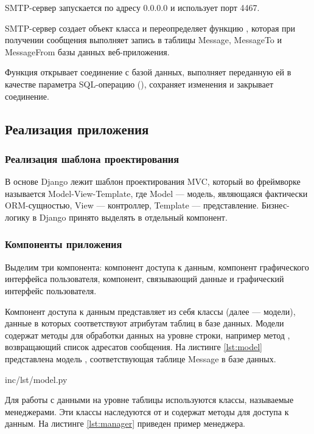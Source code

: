 SMTP-сервер запускается по адресу 0.0.0.0 и использует порт 4467.

SMTP-сервер создает объект класса  и переопределяет функцию , которая при получении сообщения выполняет запись в таблицы Message, MessageTo и MessageFrom базы данных веб-приложения.

Функция  открывает соединение с базой данных, выполняет переданную ей в качестве параметра SQL-операцию (), сохраняет изменения и закрывает соединение.

\subsection{Реализация приложения}

\subsubsection{Реализация шаблона проектирования}

В основе Django лежит шаблон проектирования MVC, который во фреймворке называется Model-View-Template, где Model --- модель, являющаяся фактически ORM-сущностью, View --- контроллер, Template --- представление. Бизнес-логику в Django принято выделять в отдельный компонент.

\subsubsection{Компоненты приложения}

Выделим три компонента: компонент доступа к данным, компонент графического интерфейса пользователя, компонент, связывающий данные и графический интерфейс пользователя.

Компонент доступа к данным представляет из себя классы  (далее — модели), данные в которых соответствуют атрибутам таблиц в базе данных. Модели содержат методы для обработки данных на уровне строки, например метод , возвращающий список адресатов сообщения. На листинге \ref{lst:model} представлена модель , соответствующая таблице Message в базе данных.

 {inc/lst/model.py}

Для работы с данными на уровне таблицы используются классы, называемые менеджерами. Эти классы наследуются от  и содержат методы для доступа к данным. На листинге \ref{lst:manager} приведен пример менеджера.


